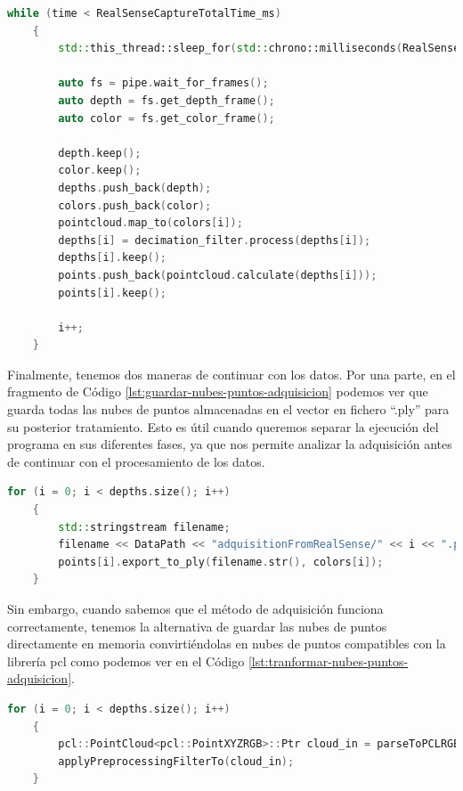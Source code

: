 \begin{lstlisting}[language={C++}, caption={Bucle para adquisición de los datos con el sensor RealSense D435}, label={lst:bucle-adquisicion}]
    while (time < RealSenseCaptureTotalTime_ms)
    {
        std::this_thread::sleep_for(std::chrono::milliseconds(RealSenseCaptureTimingBetweenCaptures_ms));
       
        auto fs = pipe.wait_for_frames();
        auto depth = fs.get_depth_frame();
        auto color = fs.get_color_frame();

        depth.keep();
        color.keep();
        depths.push_back(depth);
        colors.push_back(color);
        pointcloud.map_to(colors[i]);
        depths[i] = decimation_filter.process(depths[i]);
        depths[i].keep();
        points.push_back(pointcloud.calculate(depths[i]));
        points[i].keep();

        i++;
    }
\end{lstlisting}

Finalmente, tenemos dos maneras de continuar con los datos. Por una parte, en el fragmento de Código \ref{lst:guardar-nubes-puntos-adquisicion} podemos ver que guarda todas las nubes de puntos almacenadas en el vector en fichero ``.ply'' para su posterior tratamiento.
Esto es útil cuando queremos separar la ejecución del programa en sus diferentes fases, ya que nos permite analizar la adquisición antes de continuar con el procesamiento de los datos.

\begin{lstlisting}[language={C++}, caption={Guardar las nubes de puntos en un fichero de datos}, label={lst:guardar-nubes-puntos-adquisicion}]
    for (i = 0; i < depths.size(); i++)
    {
        std::stringstream filename;
        filename << DataPath << "adquisitionFromRealSense/" << i << ".ply";
        points[i].export_to_ply(filename.str(), colors[i]);
    }
\end{lstlisting}

Sin embargo, cuando sabemos que el método de adquisición funciona correctamente, tenemos la alternativa de guardar las nubes de puntos directamente en memoria convirtiéndolas en nubes de puntos compatibles con la librería \gls{pcl} como podemos ver en el Código \ref{lst:tranformar-nubes-puntos-adquisicion}.

\begin{lstlisting}[language={C++}, caption={Conversión de una nube de puntos de la librería RealSense a una nube de puntos de PCL}, label={lst:tranformar-nubes-puntos-adquisicion}]
    for (i = 0; i < depths.size(); i++)
    {
        pcl::PointCloud<pcl::PointXYZRGB>::Ptr cloud_in = parseToPCLRGB(points[i], colors[i]);
        applyPreprocessingFilterTo(cloud_in);
    }
\end{lstlisting}

